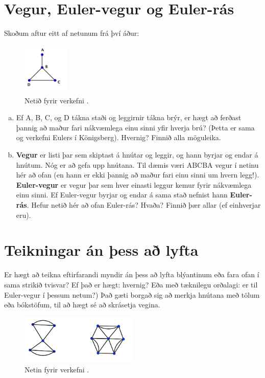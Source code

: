 \documentclass[b5paper,12pt]{book}
\renewcommand*\thesection{\arabic{section}}
\begin{document}
\section{Vegur, Euler-vegur og Euler-rás}
Skoðum aftur eitt af netunum frá því áður:

\begin{figure}[h]
  \includegraphics[width=0.2\textwidth, center]{Myndir/einfaltnet.png}
  \caption*{Netið fyrir verkefni \thesection{}.}
\end{figure}

\begin{enumerate}[(a)]
\item Ef A, B, C, og D tákna staði og leggirnir tákna brýr, er hægt að ferðast þannig að maður fari nákvæmlega einu sinni yfir hverja brú? (Þetta er sama og verkefni Eulers í Königsberg). Hvernig? Finnið alla möguleika.
\item \textbf{Vegur} er listi þar sem skiptast á hnútar og leggir, og hann byrjar og endar á hnútum. Nóg er að gefa upp hnútana. Til dæmis væri ABCBA vegur í netinu hér að ofan (en hann er ekki þannig að maður fari einu sinni um hvern legg!). \textbf{Euler-vegur} er vegur þar sem hver einasti leggur kemur fyrir nákvæmlega einu sinni. Ef Euler-vegur byrjar og endar á sama stað nefnist hann \textbf{Euler-rás}. 
Hefur netið hér að ofan Euler-rás? Hvaða? Finnið þær allar (ef einhverjar eru).
\end{enumerate}

\section{Teikningar án þess að lyfta}
Er hægt að teikna eftirfarandi myndir án þess að lyfta blýantinum eða fara ofan í sama strikið tvisvar? Ef það er hægt: hvernig? Eða með tæknilegu orðalagi: er til Euler-vegur í þessum netum?) Það gæti borgað sig að merkja hnútana með tölum eða bókstöfum, til að hægt sé að skrásetja vegina.

\begin{figure}[h]
  \includegraphics[width=0.5\textwidth, center]{Myndir/Eulerspurning1.png}
  \caption*{Netin fyrir verkefni \thesection{}.}
\end{figure}
\end{document}
